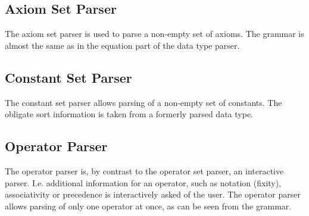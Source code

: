 \subsection{Axiom Set Parser}
The axiom set parser is used to parse a non-empty set of axioms.
The grammar is almost the same
as in the equation part of the data type parser.
\begin{center}
\end{center}

\subsection{Constant Set Parser}
The constant set parser allows parsing of a non-empty set of constants.
The obligate sort information is taken from a formerly parsed data type.
\begin{center}
\end{center}

\subsection{Operator Parser}
The operator parser is, by contrast to the operator set parser, an interactive
parser. I.e. additional information for an operator, such as notation
(fixity), associativity or precedence is interactively asked of the user.
The operator parser allows parsing of only one operator at once, as can be
seen from the grammar.
\begin{center}
\end{center}

